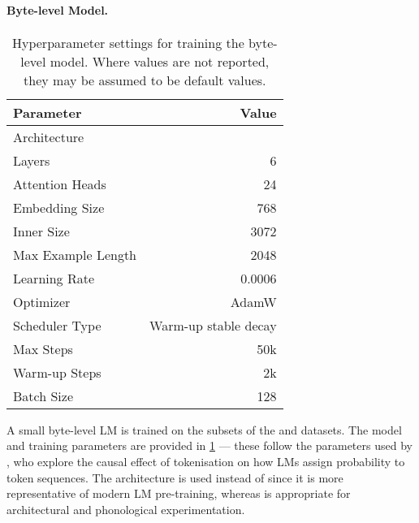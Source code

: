\paragraph{Byte-level Model.} 

\begin{table}[t]
    \centering
    \small
    \begin{tabular}{lr}
        \toprule
        Parameter & Value \\
        \midrule
        Architecture & \llama-2 \\
        Layers & 6 \\
        Attention Heads & 24 \\
        Embedding Size & 768 \\
        Inner Size & 3072 \\
        \midrule
        Max Example Length & 2048 \\
        Learning Rate & 0.0006 \\
        Optimizer & AdamW \\
        Scheduler Type & Warm-up stable decay \\
        Max Steps & 50k \\
        Warm-up Steps & 2k \\
        Batch Size & 128 \\
        \bottomrule
    \end{tabular}
    \caption{Hyperparameter settings for training the \llama byte-level model. Where values are not reported, they may be assumed to be default values.}
    \label{tab:16-trainingparams}
\end{table}


A small byte-level LM is trained on the subsets of the \fineweb and \commoncorpus datasets. The model and training parameters are provided in \cref{tab:16-trainingparams} --- these follow the parameters used by \citet{lesci2025causal}, who explore the causal effect of tokenisation on how LMs assign probability to token sequences. The \llama architecture is used instead of \gpt since it is more representative of modern LM pre-training, whereas \gpt is appropriate for architectural and phonological experimentation.

